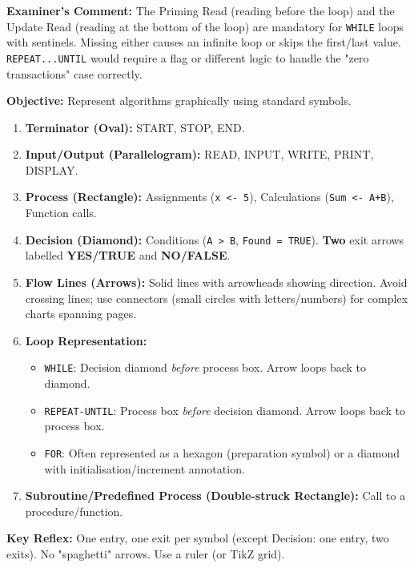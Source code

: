 \documentclass[11pt]{article}
\newcommand{\cle}[1]{{\popxbold\color{popdark}#1}}
\begin{document}
\begin{exoresolu}
\noindent\textbf{Examiner's Comment:} The \cle{Priming Read} (reading before the loop) and the \cle{Update Read} (reading at the bottom of the loop) are mandatory for \texttt{WHILE} loops with sentinels. Missing either causes an infinite loop or skips the first/last value. \texttt{REPEAT...UNTIL} would require a flag or different logic to handle the "zero transactions" case correctly.
\end{exoresolu}

\begin{methode}
\textbf{Objective:} Represent algorithms graphically using standard symbols.
\begin{enumerate}
    \item \textbf{Terminator (Oval):} START, STOP, END.
    \item \textbf{Input/Output (Parallelogram):} READ, INPUT, WRITE, PRINT, DISPLAY.
    \item \textbf{Process (Rectangle):} Assignments (\texttt{x <- 5}), Calculations (\texttt{Sum <- A+B}), Function calls.
    \item \textbf{Decision (Diamond):} Conditions (\texttt{A > B}, \texttt{Found = TRUE}). \textbf{Two} exit arrows labelled \textbf{YES/TRUE} and \textbf{NO/FALSE}.
    \item \textbf{Flow Lines (Arrows):} Solid lines with arrowheads showing direction. Avoid crossing lines; use connectors (small circles with letters/numbers) for complex charts spanning pages.
    \item \textbf{Loop Representation:}
        \begin{itemize}
            \item \texttt{WHILE}: Decision diamond \emph{before} process box. Arrow loops back to diamond.
            \item \texttt{REPEAT-UNTIL}: Process box \emph{before} decision diamond. Arrow loops back to process box.
            \item \texttt{FOR}: Often represented as a hexagon (preparation symbol) or a diamond with initialisation/increment annotation.
        \end{itemize}
    \item \textbf{Subroutine/Predefined Process (Double-struck Rectangle):} Call to a procedure/function.
\end{enumerate}
\textbf{Key Reflex:} One entry, one exit per symbol (except Decision: one entry, two exits). No "spaghetti" arrows. Use a ruler (or TikZ grid).
\end{methode}
\end{document}
